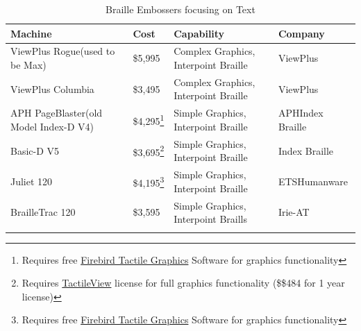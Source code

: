 \documentclass[14pt, letterpaper,twoside]{extreport}
\begin{document}
\begin{longtable}[]{@{}
	>{\raggedright\arraybackslash}p{}
	>{\raggedright\arraybackslash}p{}
	>{\raggedright\arraybackslash}p{}
	>{\raggedright\arraybackslash}p{}@{}
	}
	\toprule\noalign{}

	\textbf{Machine}                             & \textbf{Cost}                                                                                                                                                         & \textbf{Capability}                  & \textbf{Company}        \\
	\midrule\noalign{}
	\endhead
	\bottomrule\noalign{}
	\endlastfoot
	ViewPlus Rogue\break (used to be Max)        & \$5,995                                                                                                                                                               & Complex Graphics, Interpoint Braille & ViewPlus                \\[1.5em]
	ViewPlus Columbia                            & \$3,495                                                                                                                                                               & Complex Graphics, Interpoint Braille & ViewPlus                \\[1.5em]
	APH PageBlaster\break (old Model Index-D V4) & \$4,295\footnote{Requires free \href{https://www.aph.org/app/uploads/2020/07/Firebird_signed_V31.zip}{Firebird Tactile Graphics} Software for graphics functionality} & Simple Graphics, Interpoint Braille  & APH\break Index Braille \\[1.5em]
	Basic-D V5                                   & \$3,695\footnote{Requires \href{https://tactileview.com/}{TactileView} license for full graphics functionality (\$\$484 for 1 year license)}                          & Simple Graphics, Interpoint Braille  & Index Braille           \\[1.5em]
	Juliet 120                                   & \$4,195\footnote{Requires free \href{https://www.aph.org/app/uploads/2020/07/Firebird_signed_V31.zip}{Firebird Tactile Graphics} Software for graphics functionality} & Simple Graphics, Interpoint Braille  & ETS\break Humanware     \\[1.5em]
	BrailleTrac 120                              & \$3,595                                                                                                                                                               & Simple Graphics, Interpoint Braills  & Irie-AT                 \\[1.5em]\hline
	\caption{ Braille Embossers focusing on Text}
\end{longtable}
\end{document}
